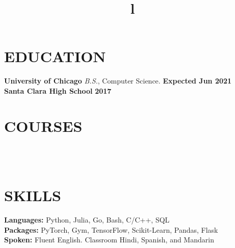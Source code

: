 \documentclass[margin]{res}
\begin{document}
\begin{resume}

\section{EDUCATION}
\textbf{University of Chicago}
{\sl B.S.}, Computer Science. \hfill \textbf{Expected Jun 2021}\\
\textbf{Santa Clara High School} \hfill \textbf{2017}

\section{COURSES}
\par
{}
\\
\\

\section{SKILLS}
\textbf{Languages:} Python, Julia, Go, Bash, C/C++, SQL\\
\textbf{Packages:} PyTorch, Gym, TensorFlow, Scikit-Learn, Pandas, Flask \\
\textbf{Spoken:} Fluent English. Classroom Hindi, Spanish, and Mandarin

\begin{format}
\title{l}\\
\\
\body\\
\end{format}

\end{resume}
\end{document}

